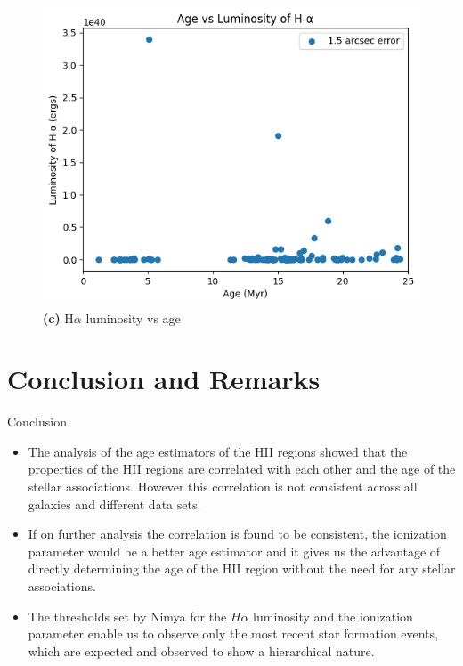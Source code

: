 \documentclass{beamer}
\begin{document}
\begin{frame}
    \begin{figure}[H]
        \centering
        \includegraphics[scale = 0.3]{image26.png}
        \caption*{\textbf{(c)} H$\alpha$ luminosity vs age}
        \label{fig:image17}
    \end{figure}
\end{frame}

\section{Conclusion and Remarks}

\begin{frame}{Conclusion}
    \begin{itemize}

    \item The analysis of the age estimators of the HII regions showed that the properties of the HII regions are correlated with each other and the age of the stellar associations. However this correlation is not consistent across all galaxies and different data sets. 
    \item If on further analysis the correlation is found to be consistent, the ionization parameter would be a better age estimator and it gives us the advantage of directly determining the age of the HII region without the need for any stellar associations. 
    \item The thresholds set by Nimya for the $H\alpha$ luminosity and the ionization parameter enable us to observe only the most recent star formation events, which are expected and observed to show a hierarchical nature.
    
    \end{itemize}
\end{frame}
\end{document}
